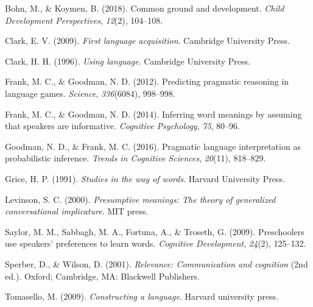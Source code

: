 \documentclass[10pt, letterpaper]{article}
\begin{document}
\hypertarget{ref-bohn2018common}{}
Bohn, M., \& Koymen, B. (2018). Common ground and development.
\emph{Child Development Perspectives}, \emph{12}(2), 104--108.

\hypertarget{ref-clark2009first}{}
Clark, E. V. (2009). \emph{First language acquisition}. Cambridge
University Press.

\hypertarget{ref-clark1996using}{}
Clark, H. H. (1996). \emph{Using language}. Cambridge University Press.

\hypertarget{ref-frank2012predicting}{}
Frank, M. C., \& Goodman, N. D. (2012). Predicting pragmatic reasoning
in language games. \emph{Science}, \emph{336}(6084), 998--998.

\hypertarget{ref-frank2014inferring}{}
Frank, M. C., \& Goodman, N. D. (2014). Inferring word meanings by
assuming that speakers are informative. \emph{Cognitive Psychology},
\emph{75}, 80--96.

\hypertarget{ref-goodman2016pragmatic}{}
Goodman, N. D., \& Frank, M. C. (2016). Pragmatic language
interpretation as probabilistic inference. \emph{Trends in Cognitive
Sciences}, \emph{20}(11), 818--829.

\hypertarget{ref-grice1991studies}{}
Grice, H. P. (1991). \emph{Studies in the way of words}. Harvard
University Press.

\hypertarget{ref-levinson2000presumptive}{}
Levinson, S. C. (2000). \emph{Presumptive meanings: The theory of
generalized conversational implicature}. MIT press.

\hypertarget{ref-saylor2009preschoolers}{}
Saylor, M. M., Sabbagh, M. A., Fortuna, A., \& Troseth, G. (2009).
Preschoolers use speakers' preferences to learn words. \emph{Cognitive
Development}, \emph{24}(2), 125--132.

\hypertarget{ref-sperber2001relevance}{}
Sperber, D., \& Wilson, D. (2001). \emph{Relevance: Communication and
cognition} (2nd ed.). Oxford; Cambridge, MA: Blackwell Publishers.

\hypertarget{ref-tomasello2009constructing}{}
Tomasello, M. (2009). \emph{Constructing a language}. Harvard university
press.


\end{document}
